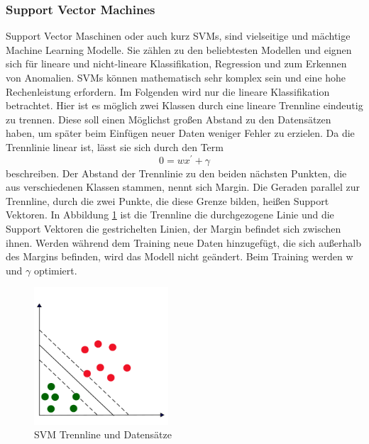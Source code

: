 	\subsubsection{Support Vector Machines}
	Support Vector Maschinen oder auch kurz SVMs, sind vielseitige und mächtige Machine Learning Modelle. Sie zählen zu den beliebtesten Modellen und eignen sich für lineare und nicht-lineare Klassifikation, Regression und zum Erkennen von Anomalien. \cite{Geron2017} SVMs können mathematisch sehr komplex sein und eine hohe Rechenleistung erfordern. \cite{Suthaharan2016} Im Folgenden wird nur die lineare Klassifikation betrachtet.\newline
	Hier ist es möglich zwei Klassen durch eine lineare Trennline eindeutig zu trennen. Diese soll einen Möglichst großen Abstand zu den Datensätzen haben, um später beim Einfügen neuer Daten weniger Fehler zu erzielen.\cite{Geron2017} Da die Trennlinie linear ist, lässt sie sich durch den Term 
		\begin{equation}
		0 = wx^{'} + \gamma
		\end{equation}
	beschreiben. \cite{Suthaharan2016} Der Abstand der Trennlinie zu den beiden nächsten Punkten, die aus verschiedenen Klassen stammen, nennt sich Margin. Die Geraden parallel zur Trennline, durch die zwei Punkte, die diese Grenze bilden, heißen Support Vektoren. In Abbildung \ref{fig:abb10} ist die Trennline die durchgezogene Linie und die Support Vektoren die gestrichelten Linien, der Margin befindet sich zwischen ihnen. Werden während dem Training neue Daten hinzugefügt, die sich außerhalb des Margins befinden, wird das Modell nicht geändert. \cite{Geron2017} Beim Training werden w und $\gamma$ optimiert. \cite{Suthaharan2016}\newline
	
	\begin{figure}[H]
		\centering
		\includegraphics[width=5cm]{Bilder/SVM.pdf}
		\caption{SVM Trennline und Datensätze}
		\label{fig:abb10}
	\end{figure}
	
